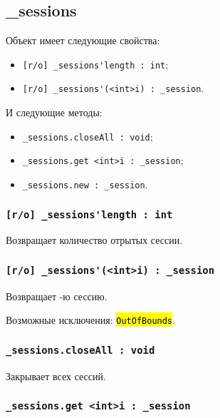 \documentclass[a4paper, 14pt]{extarticle}
\newcommand{\ferror}[1]{{\fontsize{11pt}{12pt}\tt{\sethlcolor{yellow}\hl{#1}}}}
\newenvironment{icItems}
	{ \begin{itemize} [noitemsep,nolistsep] }
	{ \end{itemize} }
\begin{document}

\subsection{{\color{orange} \_sessions}}

Объект \sessions{} имеет следующие свойства:
\begin{icItems}
	\item \lstinline|[r/o] _sessions'length : int|;
	\item \lstinline|[r/o] _sessions'(<int>i) : _session|.
\end{icItems}

И следующие методы:
\begin{icItems}
	\item \lstinline|_sessions.closeAll : void|;
	\item \lstinline|_sessions.get <int>i : _session|;
	\item \lstinline|_sessions.new : _session|.
\end{icItems}

\subsubsection{\lstinline|[r/o] _sessions'length : int|}

Возвращает количество отрытых сессии.

\subsubsection{\lstinline|[r/o] _sessions'(<int>i) : _session|}

Возвращает -ю сессию.

Возможные исключения: \ferror{OutOfBounds}.

\subsubsection{\lstinline|_sessions.closeAll : void|}

Закрывает всех сессий.

\subsubsection{\lstinline|_sessions.get <int>i : _session|}
\end{document}
